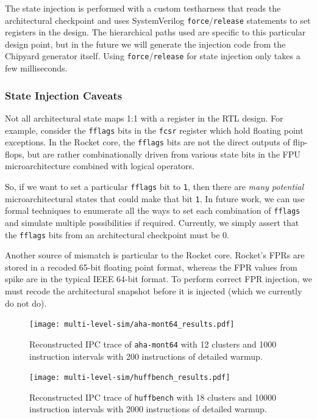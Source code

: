 \documentclass[sigplan,nonacm,10pt]{acmart}
\begin{document}
The state injection is performed with a custom testharness that reads the architectural checkpoint and uses SystemVerilog \texttt{force}/\texttt{release} statements to set registers in the design.
The hierarchical paths used are specific to this particular design point, but in the future we will generate the injection code from the Chipyard generator itself.
Using \texttt{force}/\texttt{release} for state injection only takes a few milliseconds.

\subsubsection{State Injection Caveats}

Not all architectural state maps 1:1 with a register in the RTL design.
For example, consider the \texttt{fflags} bits in the \texttt{fcsr} register which hold floating point exceptions.
In the Rocket core, the \texttt{fflags} bits are not the direct outputs of flip-flops, but are rather combinationally driven from various state bits in the FPU microarchitecture combined with logical operators.

So, if we want to set a particular \texttt{fflags} bit to \texttt{1}, then there are \textit{many potential} microarchitectural states that could make that bit \texttt{1}.
In future work, we can use formal techniques to enumerate all the ways to set each combination of \texttt{fflags} and simulate multiple possibilities if required.
Currently, we simply assert that the \texttt{fflags} bits from an architectural checkpoint must be 0.

Another source of mismatch is particular to the Rocket core.
Rocket's FPRs are stored in a recoded 65-bit floating point format, whereas the FPR values from spike are in the typical IEEE 64-bit format.
To perform correct FPR injection, we must recode the architectural snapshot before it is injected (which we currently do not do).

\begin{figure}
  \texttt{[image: multi-level-sim/aha-mont64\_results.pdf]}
  \caption{Reconstructed IPC trace of \texttt{aha-mont64} with 12 clusters and 1000 instruction intervals with 200 instructions of detailed warmup.}
  \label{fig:ipc_trace_reconstruction_aha}
\end{figure}

\begin{figure}
  \texttt{[image: multi-level-sim/huffbench\_results.pdf]}
  \caption{Reconstructed IPC trace of \texttt{huffbench} with 18 clusters and 10000 instruction intervals with 2000 instructions of detailed warmup.}
  \label{fig:ipc_trace_reconstruction_huffbench}
\end{figure}
\end{document}
